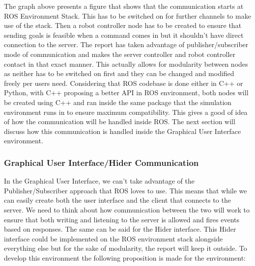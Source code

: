         The graph above presents a figure that shows that the communication starts at ROS Environment Stack. This has to be switched on for further channels to make use of the stack. Then a robot controller node has to be created to ensure that sending goals is feasible when a command comes in but it shouldn't have direct connection to the server. The report has taken advantage of publisher/subscriber mode of communication and makes the server controller and robot controller contact in that exact manner. This actually allows for modularity between nodes as neither has to be switched on first and they can be changed and modified freely per users need. Considering that ROS codebase is done either in C++ or Python, with C++ proposing a better API in ROS environment, both nodes will be created using C++ and ran inside the same package that the simulation environment runs in to ensure maximum compatibility. This gives a good of idea of how the communication will be handled inside ROS. The next section will discuss how this communication is handled inside the Graphical User Interface environment.

      \subsubsection{Graphical User Interface/Hider Communication}
        In the Graphical User Interface, we can't take advantage of the Publisher/Subscriber approach that ROS loves to use. This means that while we can easily create both the user interface and the client that connects to the server. We need to think about how communication between the two will work to ensure that both writing and listening to the server is allowed and fires events based on responses. The same can be said for the Hider interface. This Hider interface could be implemented on the ROS environment stack alongside everything else but for the sake of modularity, the report will keep it outside. To develop this environment the following proposition is made for the environment:

